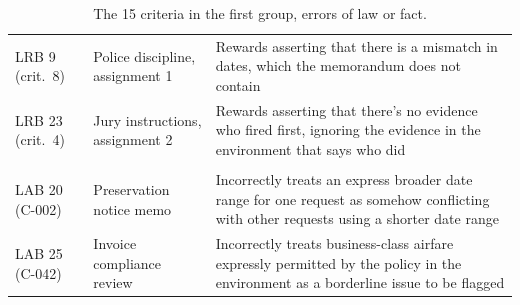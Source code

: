\documentclass[11pt]{article}
\newcommand{\auditLawFactDefects}{15}
\begin{document}
\begin{table}[htbp]
{\begin{tabular}{@{}>{\raggedright\arraybackslash}p{.16\linewidth}>{\raggedright\arraybackslash}p{.19\linewidth}>{\raggedright\arraybackslash}p{.59\linewidth}@{}}
LRB 9 (crit.\ 8) & Police discipline, assignment 1 & Rewards asserting that there is a mismatch in dates, which the memorandum does not contain\\
LRB 23 (crit.\ 4) & Jury instructions, assignment 2 & Rewards asserting that there's no evidence who fired first, ignoring the evidence in the environment that says who did\\
\addlinespace
\multicolumn{3}{@{}l}{\textit{Errors in reading interacting provisions}}\\
LAB 20 (C-002) & Preservation notice memo & Incorrectly treats an express broader date range for one request as somehow conflicting with other requests using a shorter date range\\
LAB 25 (C-042) & Invoice compliance review & Incorrectly treats business-class airfare expressly permitted by the policy in the environment as a borderline issue to be flagged\\
\bottomrule
\end{tabular}}
\caption{The \auditLawFactDefects{} criteria in the first group, errors of law or fact.}
\label{tab:errors}
\end{table}
\end{document}
